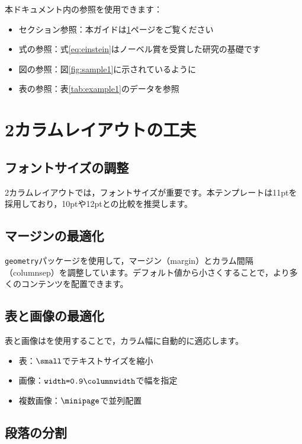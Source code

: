 \documentclass[11pt,a4paper,dvipdfmx,twocolumn]{jarticle}
\begin{document}
本ドキュメント内の参照を使用できます：

\begin{itemize}
    \item セクション参照：本ガイドは\ref{sec:tips}ページをご覧ください
    \item 式の参照：式\ref{eq:einstein}はノーベル賞を受賞した研究の基礎です
    \item 図の参照：図\ref{fig:sample1}に示されているように
    \item 表の参照：表\ref{tab:example1}のデータを参照
\end{itemize}

\section{2カラムレイアウトの工夫}
\label{sec:tips}

\subsection{フォントサイズの調整}

2カラムレイアウトでは，フォントサイズが重要です。本テンプレートは11ptを採用しており，10ptや12ptとの比較を推奨します。

\subsection{マージンの最適化}

\texttt{geometry}パッケージを使用して，マージン（margin）とカラム間隔（columnsep）を調整しています。デフォルト値から小さくすることで，より多くのコンテンツを配置できます。

\subsection{表と画像の最適化}

表と画像は\texttt{\string\columnwidth}を使用することで，カラム幅に自動的に適応します。

\begin{itemize}
    \item 表：\(\texttt{\string \small}\)でテキストサイズを縮小
    \item 画像：\(\texttt{width=0.9\string\columnwidth}\)で幅を指定
    \item 複数画像：\(\texttt{\string\minipage}\)で並列配置
\end{itemize}
\subsection{段落の分割}
\end{document}
